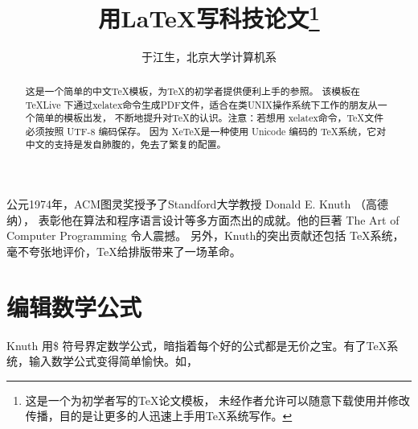 \documentclass[12pt,a4paper]{article}
\begin{document}
\newtheorem{example}{例}             %
\newtheorem{algorithm}{算法}
\newtheorem{theorem}{定理}[section]  %
\newtheorem{definition}{定义}
\newtheorem{axiom}{公理}
\newtheorem{property}{性质}
\newtheorem{proposition}{命题}
\newtheorem{lemma}{引理}
\newtheorem{corollary}{推论}
\newtheorem{remark}{注解}
\newtheorem{condition}{条件}
\newtheorem{conclusion}{结论}
\newtheorem{assumption}{假设}

\renewcommand{\contentsname}{目录}     %
\renewcommand{\abstractname}{摘要}     %
\renewcommand{\refname}{参考文献}      %
\renewcommand{\indexname}{索引}
\renewcommand{\figurename}{图}
\renewcommand{\tablename}{表}
\renewcommand{\appendixname}{附录}
\renewcommand{\proofname}{证明}
\renewcommand{\algorithm}{算法}

\title{用\LaTeX 写科技论文\thanks{这是一个为初学者写的\TeX 论文模板，
未经作者允许可以随意下载使用并修改传播，目的是让更多的人迅速上手用\TeX 系统写作。}
       }
\author{于江生，北京大学计算机系}
\date{}
\maketitle                            %
\tableofcontents                      %
\thispagestyle{empty}                 %

\begin{abstract}
\noindent 这是一个简单的中文\TeX 模板，为\TeX 的初学者提供便利上手的参照。
该模板在 \TeX Live 下通过xelatex命令生成PDF文件，适合在类UNIX操作系统下工作的朋友从一个简单的模板出发，
不断地提升对\TeX 的认识。注意：若想用 xelatex命令，\TeX 文件必须按照 UTF-8 编码保存。
因为 Xe\TeX 是一种使用 Unicode 编码的 \TeX 系统，它对中文的支持是发自肺腹的，免去了繁复的配置。
\end{abstract}

公元1974年，ACM图灵奖授予了Standford大学教授 Donald E. Knuth （高德纳），
表彰他在算法和程序语言设计等多方面杰出的成就。他的巨著 The Art of Computer Programming 令人震撼。
另外，Knuth的突出贡献还包括 \TeX 系统，毫不夸张地评价，\TeX 给排版带来了一场革命。
\section{编辑数学公式}
\indent   %
Knuth 用\$ 符号界定数学公式，暗指着每个好的公式都是无价之宝。有了\TeX 系统，输入数学公式变得简单愉快。如，
\end{document}
